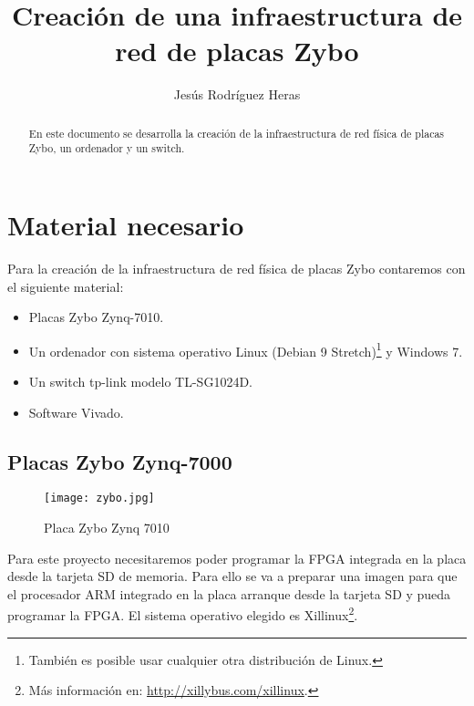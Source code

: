 \documentclass[12pt,letterpaper]{article}
\title{Creación de una infraestructura de red de placas Zybo}
\author{Jesús Rodríguez Heras}
\begin{document}
	
	\maketitle
	\begin{abstract} %
		\begin{center}
			En este documento se desarrolla la creación de la infraestructura de red física de placas Zybo, un ordenador y un switch.
		\end{center}
	\end{abstract}
	\thispagestyle{empty}
	\newpage
	
	\tableofcontents
	\newpage
	
	
	
	
	\lstset{language=bash, numbers=left, numberstyle=\tiny, numbersep=10pt, firstnumber=1, stepnumber=1, basicstyle=\small\ttfamily, tabsize=1, extendedchars=true, inputencoding=latin1}


\section{Material necesario}
Para la creación de la infraestructura de red física de placas Zybo contaremos con el siguiente material:
\begin{itemize}
	\item Placas Zybo Zynq-7010.
	\item Un ordenador con sistema operativo Linux (Debian 9 Stretch)\footnote{También es posible usar cualquier otra distribución de Linux.} y Windows 7.
	\item Un switch tp-link modelo TL-SG1024D.
	\item Software Vivado.
\end{itemize}


\subsection{Placas Zybo Zynq-7000}
\begin{figure}[h]
	\centering
	\texttt{[image: zybo.jpg]}
	\caption{Placa Zybo Zynq 7010}
	\label{Placa Zybo}
\end{figure}
Para este proyecto necesitaremos poder programar la FPGA integrada en la placa desde la tarjeta SD de memoria. Para ello se va a preparar una imagen para que el procesador ARM integrado en la placa arranque desde la tarjeta SD y pueda programar la FPGA. El sistema operativo elegido es Xillinux\footnote{Más información en: \url{http://xillybus.com/xillinux}.}.
\end{document}
